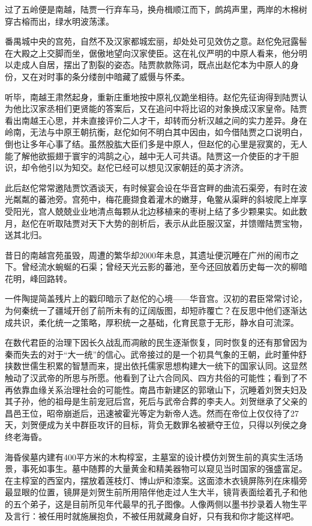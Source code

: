 过了五岭便是南越，陆贾一行弃车马，换舟楫顺江而下，鹧鸪声里，两岸的木棉树穿古榕而出，绿水明波荡漾。

番禺城中央的宫苑，自然不及汉家都城宏丽，却处处可见效仿之意。赵佗免冠露髻在大殿之上交脚而坐，倨傲地望向汉家使臣。这在礼仪严明的中原人看来，他分明以走成人自居，摆出了割裂的姿态。陆贾款款陈词，既点出赵佗本为中原人的身份，又在对时事的条分缕剖中暗藏了威慑与怀柔。

听毕，南越王肃然起身，重新庄重地按中原礼仪跪坐相待。赵佗先征询得到陆贾认为他比汉家丞相们更贤能的答案后，又在追问中将比诏的对象换成汉家皇帝。陆贾看出南越王心思，并未直接评价二人才干，却转而分析汉越之间的实力差异。身在岭南，无法与中原王朝抗衡，赵佗如何不明白其中因由，如今借陆贾之口说明白，倒也让多年心事了结。虽然股肱大臣们多是中原人，但赵佗的心里是寂寞的，无人能了解他欲振翅于寰宇的鸿鹄之心，越中无人可共语。陆贾这一介使臣的才干胆识，却令他引以为知交。赵佗已经可以想见汉家朝廷的英才济济。

此后赵佗常常邀陆贾饮酒谈天，有时候宴会设在华音宫畔的曲流石渠旁，有时在波光粼粼的蕃池旁。宫苑中，梅花鹿撷食着灌木的嫩芽，龟鳖从渠畔的斜坡爬上岸享受阳光，宫人兢兢业业地清点每颗从北边移植来的枣树上结了多少颗果实。如此数月，赵佗在听取陆贾对天下大势的剖析后，表示从此臣服汉室，并馈赠陆贾宝物，送其北归。

昔日的南越宫苑虽毁，周遭的繁华却2000年未息，其遗址便沉睡在广州的闹市之下。曾经流水蜿蜒的石渠；曾经天光云影的蕃池，至今还回放着历史每一次的柳暗花明，峰回路转。

一件陶提简盖残片上的戳印暗示了赵佗的心境——华音宫。汉初的君臣常常讨论，为何秦统一了疆域开创了前所未有的辽阔版图，却短祚覆亡？在反思中他们逐渐达成共识，柔化统一之策略，厚积统一之基础，化育民意于无形，静水自可流深。

在数代君臣的治理下因长久战乱而凋敝的民生逐渐恢复，同时恢复的还有那曾因为秦而失去的对于“大一统”的信心。武帝接过的是一个初具气象的王朝，此时董仲舒挟数世儒生积累的智慧而来，提出依托儒家思想构建大一统下的国家认同。这显然触动了汉武帝的所思与所愿。他看到了让六合同风、四方共俗的可能性；看到了不再依靠血缘关系治理社会的可能性。南昌市新建区的郭墩山下，沉睡着刘贺夫妇及其子孙，他的祖母是生前宠冠后宫，死后与武帝合葬的李夫人。刘贺继承了父亲的昌邑王位，昭帝崩逝后，迅速被霍光等定为新帝人选。然而在帝位上仅仅待了27天，刘贺便成为关中群臣攻讦的目标，背负无数罪名被褫夺王位，只得以列侯之身终老海昏。

海昏侯墓内建有400平方米的木构椁室，主墓室的设计模仿刘贺生前的真实生活场景，事死如事生。墓中随葬的大量黄金和精美器物可以窥见当时国家的强盛富足。在主椁室的西室内，摆放着莲枝灯、博山炉和漆案。这面漆木衣镜屏陈列在床榻旁最显眼的位置，镜屏是刘贺生前所用陪伴他走过人生大半，镜背表面绘着孔子和他的五个弟子，这是目前所见年代最早的孔子图像。人像两侧以墨书抄录着人物生平及言行：被任用时就施展抱负，不被任用就藏身自好，只有我和你才能这样吧。

